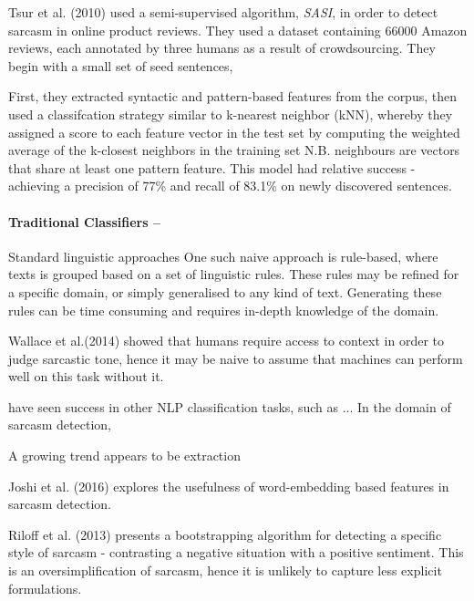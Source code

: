 \documentclass[12pt,a4paper]{article}
\begin{document}
Tsur et al. (2010) \cite{tsur2010icwsm} used a semi-supervised algorithm, \textit{SASI}, in order to detect sarcasm in online product reviews.  They used a dataset containing 66000 Amazon reviews, each annotated by three humans as a result of crowdsourcing. They begin with a small set of seed sentences, 


First, they extracted syntactic and pattern-based features from the corpus, then used a classifcation strategy similar to k-nearest neighbor (kNN), whereby they assigned a score to each feature vector in the test set by computing the weighted average of the k-closest neighbors in the training set N.B. neighbours are vectors that share at least one pattern feature. This model had relative success - achieving a precision of 77\% and recall of 83.1\% on newly discovered sentences.




\paragraph{Traditional Classifiers --}
Standard linguistic approaches
One such naive approach is rule-based, where texts is grouped based on a set of linguistic rules. These rules may be refined for a specific domain, or simply generalised to any kind of text. Generating these rules can be time consuming and requires in-depth knowledge of the domain. 


Wallace et al.(2014) showed that humans require access to context in order to judge sarcastic tone, hence it may be naive to assume that machines can perform well on this task without it. 

have seen success in other NLP classification tasks, such as ... In the domain of sarcasm detection, 

A growing trend appears to be extraction 


Joshi et al. (2016) explores the usefulness of word-embedding based features in sarcasm detection. 

Riloff et al. (2013) presents a bootstrapping algorithm for detecting a specific style of sarcasm - contrasting a negative situation with a positive sentiment. This is an oversimplification of sarcasm, hence it is unlikely to capture less explicit formulations.
\end{document}
